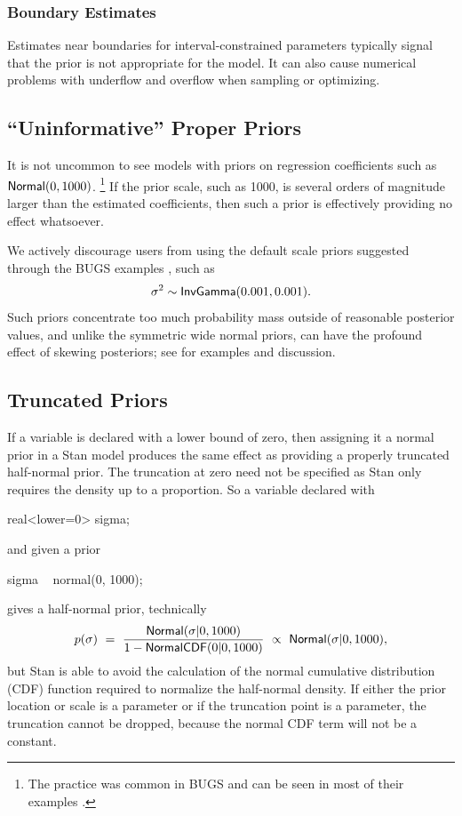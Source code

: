 \subsubsection{Boundary Estimates}

Estimates near boundaries for interval-constrained parameters
typically signal that the prior is not appropriate for the model.  It
can also cause numerical problems with underflow and overflow when
sampling or optimizing.

\subsection{``Uninformative'' Proper Priors}

It is not uncommon to see models with priors on regression
coefficients such as $\distro{Normal}(0,1000)$.%
%
\footnote{The practice was common in BUGS and can be seen in most of
  their examples \cite{LunnEtAl:2012}.}
%
If the prior scale, such as 1000, is several orders of magnitude
larger than the estimated coefficients, then such a prior is
effectively providing no effect whatsoever.  

We actively discourage users from using the default scale priors
suggested through the BUGS examples \citep{LunnEtAl:2012}, such as
\[
\sigma^2 \sim \distro{InvGamma}(0.001, 0.001).
\]
%
Such priors concentrate too much probability mass outside of
reasonable posterior values, and unlike the symmetric wide normal
priors, can have the profound effect of skewing posteriors; see
\citep{Gelman:2006} for examples and discussion.

\subsection{Truncated Priors}

If a variable is declared with a lower bound of zero, then assigning
it a normal prior in a Stan model produces the same effect as
providing a properly truncated half-normal prior.  The truncation at
zero need not be specified as Stan only requires the density up to a
proportion.  So a variable declared with
%
\begin{stancode}
real<lower=0> sigma;
\end{stancode}
%
and given a prior
\begin{stancode}
sigma ~ normal(0, 1000);
\end{stancode}
%
gives  a half-normal prior, technically
%
\[
p(\sigma) 
\ = \
\frac{\distro{Normal}(\sigma | 0, 1000)}
     {1 - \distro{NormalCDF}(0 | 0, 1000)}
\ \propto \
\distro{Normal}(\sigma | 0, 1000),
\]
%
but Stan is able to avoid the calculation of the normal cumulative
distribution (CDF) function required to normalize the half-normal density.
If either the prior location or scale is a parameter or if the
truncation point is a parameter, the truncation cannot be dropped,
because the normal CDF term will not be a constant.


